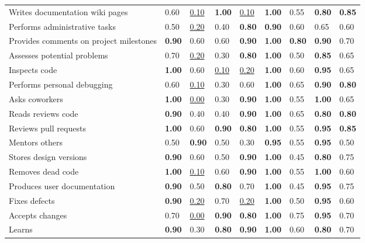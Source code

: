 \begin{tabular}{lllllllll}
Writes documentation wiki pages & 0.60 & \underline{0.10} & \textbf{1.00} & \underline{0.10} & \textbf{1.00} & 0.55 & \textbf{0.80} & \textbf{0.85} \\
Performs administrative tasks & 0.50 & \underline{0.20} & 0.40 & \textbf{0.80} & \textbf{0.90} & 0.60 & 0.65 & 0.60 \\
Provides comments on project milestones & \textbf{0.90} & 0.60 & 0.60 & \textbf{0.90} & \textbf{1.00} & \textbf{0.80} & \textbf{0.90} & 0.70 \\
Assesses potential problems & 0.70 & \underline{0.20} & 0.30 & \textbf{0.80} & \textbf{1.00} & 0.50 & \textbf{0.85} & 0.65 \\
Inspects code & \textbf{1.00} & 0.60 & \underline{0.10} & \underline{0.20} & \textbf{1.00} & 0.60 & \textbf{0.95} & 0.65 \\
Performs personal debugging & 0.60 & \underline{0.10} & 0.30 & 0.60 & \textbf{1.00} & 0.65 & \textbf{0.90} & \textbf{0.80} \\
Asks coworkers & \textbf{1.00} & \underline{0.00} & 0.30 & \textbf{0.90} & \textbf{1.00} & 0.55 & \textbf{1.00} & 0.65 \\
Reads reviews code & \textbf{0.90} & 0.40 & 0.40 & \textbf{0.90} & \textbf{1.00} & 0.65 & \textbf{0.80} & \textbf{0.80} \\
Reviews pull requests & \textbf{1.00} & 0.60 & \textbf{0.90} & \textbf{0.80} & \textbf{1.00} & 0.55 & \textbf{0.95} & \textbf{0.85} \\
Mentors others & 0.50 & \textbf{0.90} & 0.50 & 0.30 & \textbf{0.95} & 0.55 & \textbf{0.95} & 0.50 \\
Stores design versions & \textbf{0.90} & 0.60 & 0.50 & \textbf{0.90} & \textbf{1.00} & 0.45 & \textbf{0.80} & 0.75 \\
Removes dead code & \textbf{1.00} & \underline{0.10} & 0.60 & \textbf{0.90} & \textbf{1.00} & 0.55 & \textbf{1.00} & 0.60 \\
Produces user documentation & \textbf{0.90} & 0.50 & \textbf{0.80} & 0.70 & \textbf{1.00} & 0.45 & \textbf{0.95} & 0.75 \\
Fixes defects & \textbf{0.90} & \underline{0.20} & 0.70 & \underline{0.20} & \textbf{1.00} & 0.50 & \textbf{0.95} & 0.60 \\
Accepts changes & 0.70 & \underline{0.00} & \textbf{0.90} & \textbf{0.80} & \textbf{1.00} & 0.75 & \textbf{0.95} & 0.70 \\
Learns & \textbf{0.90} & 0.30 & \textbf{0.80} & \textbf{0.90} & \textbf{1.00} & 0.60 & \textbf{0.80} & 0.70 \\

\end{tabular}
